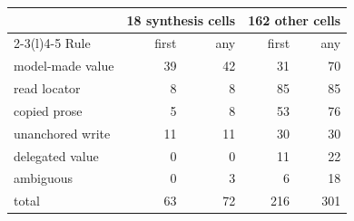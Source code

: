 \begin{tabular}{@{}lrrrr@{}}
\toprule
 & \multicolumn{2}{c}{18 synthesis cells} & \multicolumn{2}{c}{162 other cells} \\
\cmidrule(lr){2-3}\cmidrule(l){4-5}
Rule & first & any & first & any \\
\midrule
model-made value & 39 & 42 & 31 & 70 \\
read locator & 8 & 8 & 85 & 85 \\
copied prose & 5 & 8 & 53 & 76 \\
unanchored write & 11 & 11 & 30 & 30 \\
delegated value & 0 & 0 & 11 & 22 \\
ambiguous & 0 & 3 & 6 & 18 \\
\midrule
total & 63 & 72 & 216 & 301 \\
\bottomrule
\end{tabular}
